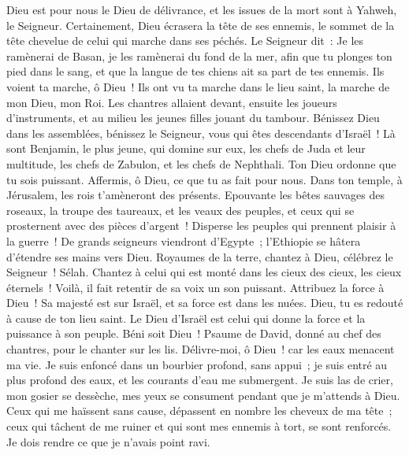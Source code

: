 \begin{multicols}{2}
Dieu est pour nous le Dieu de délivrance, et les issues de la mort sont à Yahweh, le Seigneur.
Certainement, Dieu écrasera la tête de ses ennemis, le sommet de la tête chevelue de celui qui marche dans ses péchés.
Le Seigneur dit~: Je les ramènerai de Basan, je les ramènerai du fond de la mer,
afin que tu plonges ton pied dans le sang, et que la langue de tes chiens ait sa part de tes ennemis.
Ils voient ta marche, ô Dieu~! Ils ont vu ta marche dans le lieu saint, la marche de mon Dieu, mon Roi.
Les chantres allaient devant, ensuite les joueurs d'instruments, et au milieu les jeunes filles jouant du tambour.
Bénissez Dieu dans les assemblées, bénissez le Seigneur, vous qui êtes descendants d'Israël~!
Là sont Benjamin, le plus jeune, qui domine sur eux, les chefs de Juda et leur multitude, les chefs de Zabulon, et les chefs de Nephthali.
Ton Dieu ordonne que tu sois puissant. Affermis, ô Dieu, ce que tu as fait pour nous.
Dans ton temple, à Jérusalem, les rois t'amèneront des présents.
Epouvante les bêtes sauvages des roseaux, la troupe des taureaux, et les veaux des peuples, et ceux qui se prosternent avec des pièces d'argent~! Disperse les peuples qui prennent plaisir à la guerre~!
De grands seigneurs viendront d'Egypte~; l'Ethiopie se hâtera d'étendre ses mains vers Dieu.
Royaumes de la terre, chantez à Dieu, célébrez le Seigneur~! Sélah.
Chantez à celui qui est monté dans les cieux des cieux, les cieux éternels~! Voilà, il fait retentir de sa voix un son puissant.
Attribuez la force à Dieu~! Sa majesté est sur Israël, et sa force est dans les nuées.
Dieu, tu es redouté à cause de ton lieu saint. Le Dieu d'Israël est celui qui donne la force et la puissance à son peuple. Béni soit Dieu~!
\VerseOne{}Psaume de David, donné au chef des chantres, pour le chanter sur les lis.
Délivre-moi, ô Dieu~! car les eaux menacent ma vie.
Je suis enfoncé dans un bourbier profond, sans appui~; je suis entré au plus profond des eaux, et les courants d'eau me submergent.
Je suis las de crier, mon gosier se dessèche, mes yeux se consument pendant que je m'attends à Dieu.
Ceux qui me haïssent sans cause, dépassent en nombre les cheveux de ma tête~; ceux qui tâchent de me ruiner et qui sont mes ennemis à tort, se sont renforcés. Je dois rendre ce que je n'avais point ravi.

\end{multicols}

